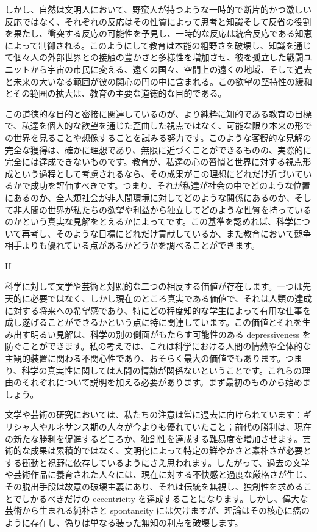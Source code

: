 \documentclass[a4paper,11pt,openany]{ltjsbook}
\begin{document}
しかし、自然は文明人において、野蛮人が持つような一時的で断片的かつ激しい反応ではなく、それぞれの反応はその性質によって思考と知識そして反省の役割を果たし、衝突する反応の可能性を予見し、一時的な反応は統合反応である知恵によって制御される。このようにして教育は本能の粗野さを破壊し、知識を通じて個々人の外部世界との接触の豊かさと多様性を増加させ、彼を孤立した戦闘ユニットから宇宙の市民に変える、遠くの国々、空間上の遠くの地域、そして過去と未来の大いなる範囲が彼の関心の円の中に含まれる。この欲望の堅持性の緩和とその範囲の拡大は、教育の主要な道徳的な目的である。

この道徳的な目的と密接に関連しているのが、より純粋に知的である教育の目標で、私達を個人的な欲望を通じた歪曲した視点ではなく、可能な限り本来の形での世界を見ることや想像することを試みる努力です。このような客観的な見解の完全な獲得は、確かに理想であり、無限に近づくことができるものの、実際的に完全には達成できないものです。教育が、私達の心の習慣と世界に対する視点形成という過程として考慮されるなら、その成果がこの理想にどれだけ近づいているかで成功を評価すべきです。つまり、それが私達が社会の中でどのような位置にあるのか、全人類社会が非人間環境に対してどのような関係にあるのか、そして非人間の世界が私たちの欲望や利益から独立してどのような性質を持っているのかという真実な見解をとえるかによってです。この基準を認めれば、科学について再考し、そのような目標にどれだけ貢献しているか、また教育において競争相手よりも優れている点があるかどうかを調べることができます。

II

科学に対して文学や芸術と対照的な二つの相反する価値が存在します。一つは先天的に必要ではなく、しかし現在のところ真実である価値で、それは人類の達成に対する将来への希望感であり、特にどの程度知的な学生によって有用な仕事を成し遂げることができるかという点に特に関連しています。この価値とそれを生み出す明るい見解は、科学の別の側面がもたらす可能性のある depressiveness を防ぐことができます。私の考えでは、これは科学における人間の情熱や全体的な主観的装置に関わる不関心性であり、おそらく最大の価値でもあります。つまり、科学の真実性に関しては人間の情熱が関係ないということです。これらの理由のそれぞれについて説明を加える必要があります。まず最初のものから始めましょう。

文学や芸術の研究においては、私たちの注意は常に過去に向けられています：ギリシャ人やルネサンス期の人々が今よりも優れていたこと；前代の勝利は、現在の新たな勝利を促進するどころか、独創性を達成する難易度を増加させます。芸術的な成果は累積的ではなく、文明化によって特定の鮮やかさと素朴さが必要とする衝動と視野に依存しているようにさえ思われます。したがって、過去の文学や芸術作品に養育された人々には、現在に対する不快感と過度な厳格さが生じ、その脱出手段は故意の破壊主義にあり、それは伝統を無視し、独創性を求めることでしかるべきだけの eccentricity を達成することになります。しかし、偉大な芸術から生まれる純朴さと spontaneity には欠けますが、理論はその核心に癌のように存在し、偽りは単なる装った無知の利点を破壊します。
\end{document}
